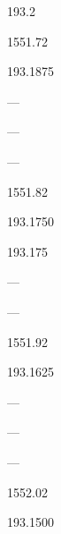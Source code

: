 \documentclass[letterpaper,10pt,english]{sphinxmanual}
\begin{document}
193.2





1551.72









193.1875





—





—





—





1551.82









193.1750





193.175





—





—





1551.92









193.1625





—





—





—





1552.02









193.1500
\end{document}
